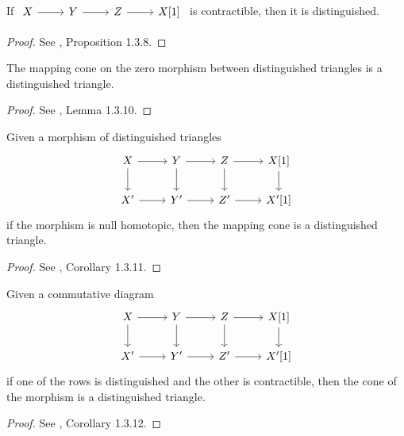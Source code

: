 \documentclass[dissertation.tex]{subfiles}
\begin{document}
\begin{prop}
  If 
  $\begin{tikzcd}
    X \arrow{r} & Y \arrow{r} & Z \arrow{r} & X[1]
  \end{tikzcd}$
  is contractible, then it is distinguished.

  \begin{proof}
    See \cite{NeemanTCats}, Proposition 1.3.8.
  \end{proof}
\end{prop}

\begin{lem}
  The mapping cone on the zero morphism between distinguished triangles is a distinguished triangle.

  \begin{proof}
    See \cite{NeemanTCats}, Lemma 1.3.10.
  \end{proof}
\end{lem}

\begin{cor}
  Given a morphism of distinguished triangles
  $$\begin{tikzcd}
    X \arrow{r}\arrow{d} & Y \arrow{r}\arrow{d} & Z \arrow{r}\arrow{d} & X[1]\arrow{d}\\
    X^\prime \arrow{r} & Y^\prime \arrow{r} & Z^\prime \arrow{r} & X^\prime[1]
  \end{tikzcd}$$
  if the morphism is null homotopic, then the mapping cone is a distinguished triangle.
  
  \begin{proof}
    See \cite{NeemanTCats}, Corollary 1.3.11.
  \end{proof}
\end{cor}

\begin{cor}
  Given a commutative diagram
  $$\begin{tikzcd}
    X \arrow{r}\arrow{d} & Y \arrow{r}\arrow{d} & Z \arrow{r}\arrow{d} & X[1]\arrow{d}\\
    X^\prime \arrow{r} & Y^\prime \arrow{r} & Z^\prime \arrow{r} & X^\prime[1]
  \end{tikzcd}$$
  if one of the rows is distinguished and the other is contractible, then the cone of the morphism is a distinguished triangle.
  
  \begin{proof}
    See \cite{NeemanTCats}, Corollary 1.3.12.
  \end{proof}
\end{cor}
\end{document}
